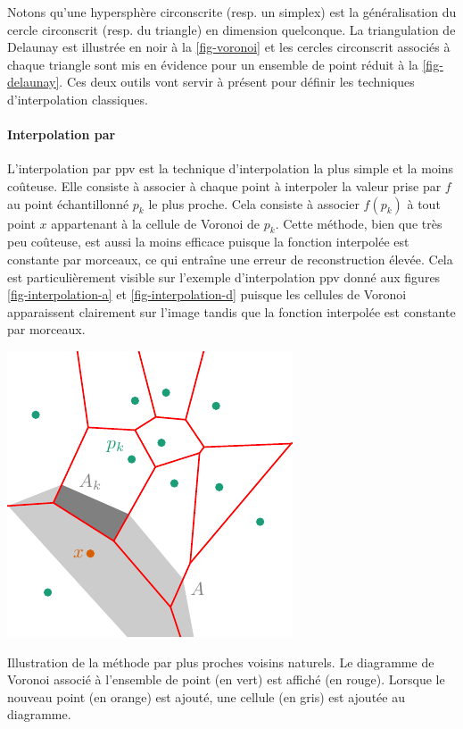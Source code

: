 Notons qu'une hypersphère circonscrite (resp. un simplex) est la généralisation du cercle circonscrit (resp. du triangle) en dimension quelconque. La triangulation de Delaunay est illustrée en noir à la \cref{fig-voronoi} et les cercles circonscrit associés à chaque triangle sont mis en évidence pour un ensemble de point réduit à la \cref{fig-delaunay}. Ces deux outils vont servir à présent pour définir les techniques d'interpolation classiques.


\paragraph{Interpolation par } L'interpolation par \gls{ppv} est la technique d'interpolation la plus simple et la moins coûteuse. Elle consiste à associer à chaque point à interpoler la valeur prise par $f$ au point échantillonné $p_{k}$ le plus proche. Cela consiste à associer $f(p_{k})$ à tout point $x$ appartenant à la cellule de Voronoi de $p_{k}$. Cette méthode, bien que très peu coûteuse, est aussi la moins efficace puisque la fonction interpolée est constante par morceaux, ce qui entraîne une erreur de reconstruction élevée. Cela est particulièrement visible sur l'exemple d'interpolation \gls{ppv} donné aux figures \ref{fig-interpolation-a} et \ref{fig-interpolation-d} puisque les cellules de Voronoi apparaissent clairement sur l'image tandis que la fonction interpolée est constante par morceaux. %
\begin{marginfigure}
    \centering
    \includegraphics[]{img/chapitre3/figure3/Voronoi_Natural.pdf}
    \caption{Illustration de la méthode par plus proches voisins naturels. Le diagramme de Voronoi associé à l'ensemble de point (en vert) est affiché (en rouge). Lorsque le nouveau point (en orange) est ajouté, une cellule (en gris) est ajoutée au diagramme.}
    \label{fig-natural-weight}
\end{marginfigure}
